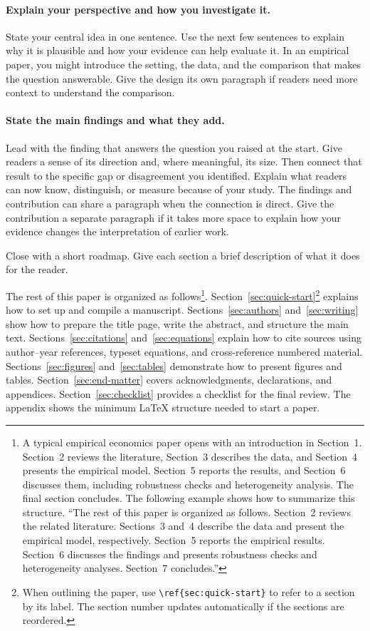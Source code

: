 \documentclass{templates/aidealabs-paper}
\begin{document}
\paragraph{Explain your perspective and how you investigate it.}
State your central idea in one sentence.
Use the next few sentences to explain why it is plausible and how your evidence can help evaluate it.
In an empirical paper, you might introduce the setting, the data, and the comparison that makes the question answerable.
Give the design its own paragraph if readers need more context to understand the comparison.

\paragraph{State the main findings and what they add.}
Lead with the finding that answers the question you raised at the start.
Give readers a sense of its direction and, where meaningful, its size.
Then connect that result to the specific gap or disagreement you identified.
Explain what readers can now know, distinguish, or measure because of your study.
The findings and contribution can share a paragraph when the connection is direct.
Give the contribution a separate paragraph if it takes more space to explain how your evidence changes the interpretation of earlier work.

Close with a short roadmap.
Give each section a brief description of what it does for the reader.

The rest of this paper is organized as follows\footnote{A typical empirical economics paper opens with an introduction in Section~1.
Section~2 reviews the literature, Section~3 describes the data, and Section~4 presents the empirical model.
Section~5 reports the results, and Section~6 discusses them, including robustness checks and heterogeneity analysis.
The final section concludes.
The following example shows how to summarize this structure.
\enquote{The rest of this paper is organized as follows.
Section~2 reviews the related literature.
Sections~3 and~4 describe the data and present the empirical model, respectively.
Section~5 reports the empirical results.
Section~6 discusses the findings and presents robustness checks and heterogeneity analyses.
Section~7 concludes.}}.
Section~\ref{sec:quick-start}\footnote{When outlining the paper, use \texttt{\textbackslash{}ref\{sec:quick-start\}} to refer to a section by its label.
The section number updates automatically if the sections are reordered.} explains how to set up and compile a manuscript.
Sections~\ref{sec:authors} and~\ref{sec:writing} show how to prepare the title page, write the abstract, and structure the main text.
Sections~\ref{sec:citations} and~\ref{sec:equations} explain how to cite sources using author--year references, typeset equations, and cross-reference numbered material.
Sections~\ref{sec:figures} and~\ref{sec:tables} demonstrate how to present figures and tables.
Section~\ref{sec:end-matter} covers acknowledgments, declarations, and appendices.
Section~\ref{sec:checklist} provides a checklist for the final review.
The appendix shows the minimum LaTeX structure needed to start a paper.
\end{document}
